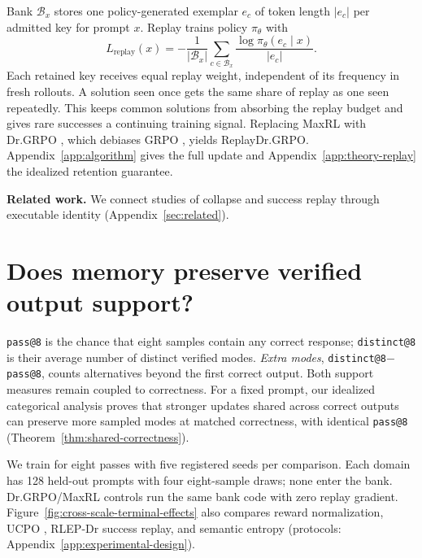 Bank $\mathcal B_x$ stores one policy-generated exemplar $e_c$ of token length
$|e_c|$ per admitted key for prompt $x$. Replay trains policy $\pi_\theta$ with
\begin{equation}
L_{\mathrm{replay}}(x)=-\frac{1}{|\mathcal B_x|}
\sum_{c\in\mathcal B_x}\frac{\log\pi_\theta(e_c\mid x)}{|e_c|}.
\label{eq:lm-verified-replay}
\end{equation}
Each retained key receives equal replay weight, independent of its frequency in
fresh rollouts. A solution seen once gets the same share of replay as one seen
repeatedly. This keeps common solutions from absorbing the replay budget and
gives rare successes a continuing training signal.
Replacing MaxRL with Dr.GRPO \citep{liu2025understanding},
which debiases GRPO \citep{shao2024deepseekmath}, yields ReplayDr.GRPO.
Appendix~\ref{app:algorithm} gives the full update and
Appendix~\ref{app:theory-replay} the idealized retention guarantee.

\noindent\textbf{Related work.} We connect studies of collapse
\citep{cui2025entropy,dang2025diversity} and success replay \citep{zhang2025rlep}
through executable identity (Appendix~\ref{sec:related}).

\section{Does memory preserve verified output support?}
\label{sec:experiments}\label{sec:results}
\texttt{pass@8} is the chance that eight samples contain any correct response;
\texttt{distinct@8} is their average number of distinct verified modes.
\emph{Extra modes}, \texttt{distinct@8}$-$\texttt{pass@8}, counts alternatives
beyond the first correct output. Both support measures remain coupled to correctness.
For a fixed prompt, our idealized categorical analysis proves that stronger
updates shared across correct outputs can preserve more sampled modes at matched correctness,
with identical \texttt{pass@8} (Theorem~\ref{thm:shared-correctness}).

We train for eight passes with five registered seeds per comparison. Each domain
has 128 held-out prompts with four eight-sample draws; none enter the bank.
Dr.GRPO/MaxRL controls run the same bank code with zero replay gradient.
Figure~\ref{fig:cross-scale-terminal-effects} also compares reward normalization,
UCPO \citep{lochab2026ucpo}, RLEP-Dr success replay, and semantic entropy
(protocols: Appendix~\ref{app:experimental-design}).

